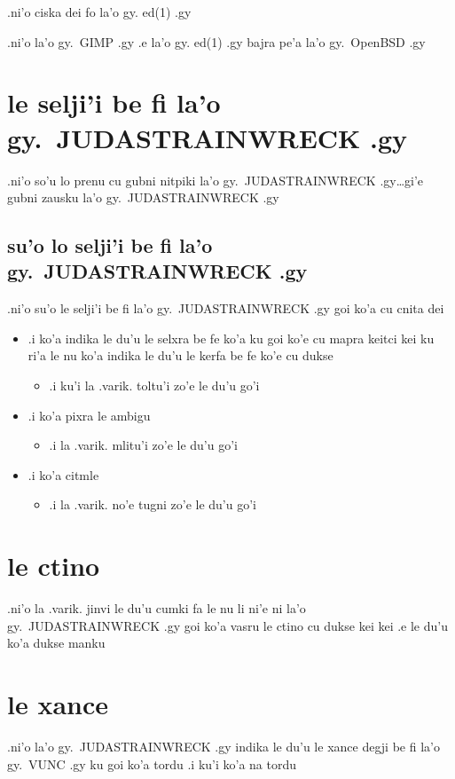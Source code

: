 \documentclass{report}
\begin{document}
.ni'o ciska dei fo la'o gy. ed(1) .gy

.ni'o la'o gy.\ GIMP .gy .e la'o gy. ed(1) .gy bajra pe'a la'o gy.\ OpenBSD .gy

\section{le selji'i be fi la'o gy.\ JUDASTRAINWRECK .gy}
.ni'o so'u lo prenu cu gubni nitpiki la'o gy.\ JUDASTRAINWRECK .gy\ldots gi'e gubni zausku la'o gy.\ JUDASTRAINWRECK .gy

\subsection{su'o lo selji'i be fi la'o gy.\ JUDASTRAINWRECK .gy}
.ni'o su'o le selji'i be fi la'o gy.\ JUDASTRAINWRECK .gy goi ko'a cu cnita dei

\begin{itemize}
	\item .i ko'a indika le du'u le selxra be fe ko'a ku goi ko'e cu mapra keitci kei ku ri'a le nu ko'a indika le du'u le kerfa be fe ko'e cu dukse 
	\begin{itemize}
		\item .i ku'i la .varik. toltu'i zo'e le du'u go'i
	\end{itemize}
	\item .i ko'a pixra le ambigu
	\begin{itemize}
		\item .i la .varik. mlitu'i zo'e le du'u go'i
	\end{itemize}
	\item .i ko'a citmle
	\begin{itemize}
		\item .i la .varik. no'e tugni zo'e le du'u go'i
	\end{itemize}
\end{itemize}
\section{le ctino}
.ni'o la .varik. jinvi le du'u cumki fa le nu li ni'e ni la'o gy.\ JUDASTRAINWRECK .gy goi ko'a vasru le ctino cu dukse kei kei .e le du'u ko'a dukse manku

\section{le xance}
.ni'o la'o gy.\ JUDASTRAINWRECK .gy indika le du'u le xance degji be fi la'o gy.\ VUNC .gy ku goi ko'a tordu  .i ku'i ko'a na tordu
\end{document}
